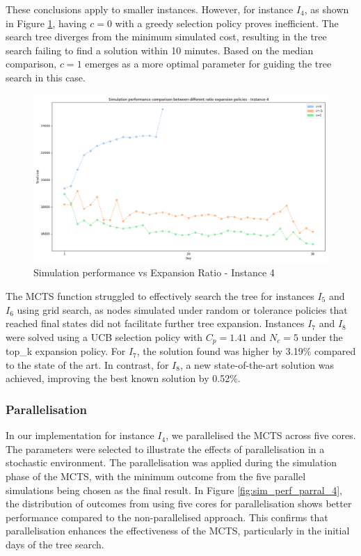 These conclusions apply to smaller instances. However, for instance $I_4$, as shown in Figure \ref{fig:sim_perf_vs_c_4}, having $c=0$ with a greedy selection policy proves inefficient. The search tree diverges from the minimum simulated cost, resulting in the tree search failing to find a solution within 10 minutes. Based on the median comparison, $c=1$ emerges as a more optimal parameter for guiding the tree search in this case.

\begin{figure}[!ht]
    \centering
    \includegraphics[width=.4\textwidth]{Figures/4 - Simulation performance vs Expansion ratio.png}
    \caption{Simulation performance vs Expansion Ratio - Instance 4}
    \label{fig:sim_perf_vs_c_4}
\end{figure}

The MCTS function struggled to effectively search the tree for instances $I_5$ and $I_6$ using grid search, as nodes simulated under random or tolerance policies that reached final states did not facilitate further tree expansion. Instances $I_7$ and $I_8$ were solved using a UCB selection policy with \(C_p = 1.41\) and \(N_c = 5\) under the top\_k expansion policy. For $I_7$, the solution found was higher by 3.19\% compared to the state of the art. In contrast, for $I_8$, a new state-of-the-art solution was achieved, improving the best known solution by 0.52\%.

\subsubsection*{Parallelisation}

In our implementation for instance $I_4$, we parallelised the MCTS across five cores. The parameters were selected to illustrate the effects of parallelisation in a stochastic environment. The parallelisation was applied during the simulation phase of the MCTS, with the minimum outcome from the five parallel simulations being chosen as the final result. In Figure \ref{fig:sim_perf_parral_4}, the distribution of outcomes from using five cores for parallelisation shows better performance compared to the non-parallelised approach. This confirms that parallelisation enhances the effectiveness of the MCTS, particularly in the initial days of the tree search.

